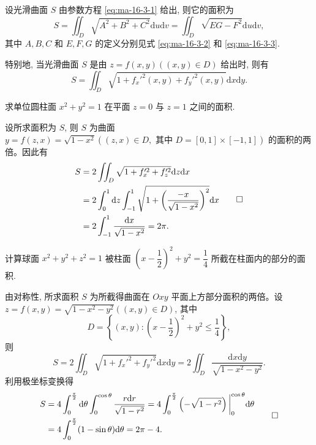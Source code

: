 \begin{theorem}\label{theorem:ma-16-3-1}
设光滑曲面 $S$ 由参数方程 \eqref{eq:ma-16-3-1} 给出, 则它的面积为
\[
  S=\iint_D \sqrt{A^2+B^2+C^2}\mathrm du\mathrm dv
  =\iint_D \sqrt{EG-F^2}\mathrm du\mathrm dv,
\]
其中 $A,B,C$ 和 $E,F,G$ 的定义分别见式 \eqref{eq:ma-16-3-2} 和 \eqref{eq:ma-16-3-3}.
\end{theorem}

特别地, 当光滑曲面 $S$ 是由 $z=f(x,y)((x,y)\in D)$ 给出时, 则有
\[
  S=\iint_D \sqrt{1+f_x'^2(x,y)+f_y'^2(x,y)}\mathrm dx\mathrm dy.
\]

\begin{example}\label{example:ma-16-3-1}
求单位圆柱面 $x^2+y^2=1$ 在平面 $z=0$ 与 $z=1$ 之间的面积.
\end{example}


\begin{solve}
设所求面积为 $S$, 则 $S$ 为曲面 $y=f(z,x)=\sqrt{1-x^2}((z,x)\in D,\text{ 其中 }D=[0,1]\times[-1,1])$ 的面积的两倍。因此有
\[
\begin{aligned}
  S&=2\iint_D\sqrt{1+f_x'^2+f_z'^2}\mathrm dz\mathrm dx\\
  &=2\int_0^1\mathrm dz\int_{-1}^1\sqrt{1+\left(\frac{-x}{\sqrt{1-x^2}}\right)^2}\mathrm dx\\
  &=2\int_{-1}^1\frac{\mathrm dx}{\sqrt{1-x^2}}=2\pi.
\end{aligned}
\qedhere
\]
\end{solve}


\begin{example}\label{example:ma-16-3-2}
计算球面 $x^2+y^2+z^2=1$ 被柱面 $\left(x-\dfrac12\right)^2+y^2=\dfrac14$ 所截在柱面内的部分的面积.
\end{example}


\begin{solve}
由对称性, 所求面积 $S$ 为所截得曲面在 $Oxy$ 平面上方部分面积的两倍。设 $z=f(x,y)=\sqrt{1-x^2-y^2}((x,y)\in D)$, 其中
\[
  D=\left\{(x,y):\left(x-\frac12\right)^2+y^2\leqslant\frac14\right\},
\]
则
\[
  S=2\iint_D\sqrt{1+f_x'^2+f_y'^2}\mathrm dx\mathrm dy
  =2\iint_D\frac{\mathrm dx\mathrm dy}{\sqrt{1-x^2-y^2}}.
\]
利用极坐标变换得
\[
\begin{aligned}
  S&=4\int_0^{\frac\pi2}\mathrm d\theta\int_0^{\cos\theta}
  \frac{r\mathrm dr}{\sqrt{1-r^2}}
  =4\int_0^{\frac\pi2}\left(-\sqrt{1-r^2}\right)\bigg|_0^{\cos\theta}\mathrm d\theta\\
  &=4\int_0^{\frac\pi2}(1-\sin\theta)\mathrm d\theta=2\pi-4.
\end{aligned}
\qedhere
\]
\end{solve}


